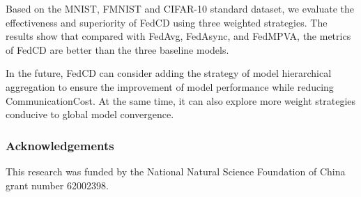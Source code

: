 \documentclass[twoside,twocolumn]{article}
\makeatletter
\def\subparagraph{\@startsection{paragraph}{5}{2\parindent}{0ex plus 0.1ex minus 0.1ex}%
{0ex}{\normalfont\small\itshape}}%
\makeatother
\begin{document}
	Based on the MNIST, FMNIST and CIFAR-10 standard dataset, we evaluate the effectiveness and superiority of FedCD using three weighted strategies. The results show that compared with FedAvg, FedAsync, and FedMPVA, the metrics of FedCD are better than the three baseline models.
	
	In the future, FedCD can consider adding the strategy of model hierarchical aggregation to ensure the improvement of model performance while reducing CommunicationCost. At the same time, it can also explore more weight strategies conducive to global model convergence.

\subsubsection{Acknowledgements} This research was funded by the National Natural Science Foundation of China grant number 62002398.









  
  
 

 



\end{document}
